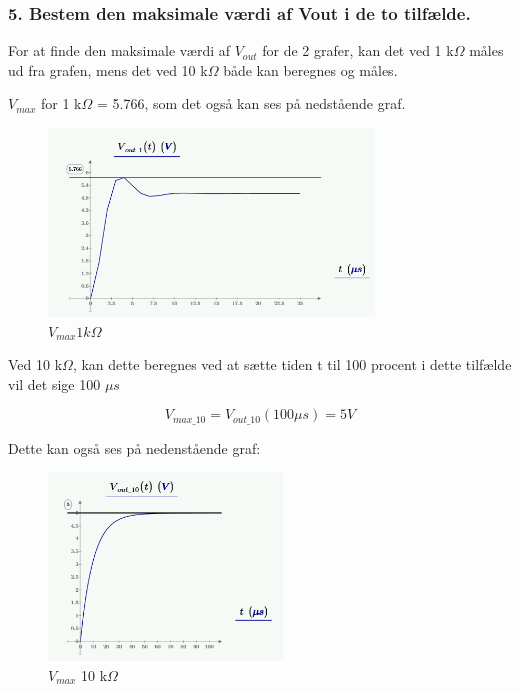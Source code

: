 \subsubsection*{5. Bestem den maksimale værdi af Vout i de to tilfælde.}

For at finde den maksimale værdi af $V_{out}$ for de 2 grafer, kan det ved 1 k$\Omega$ måles ud fra grafen, mens det ved 10 k$\Omega$ både kan beregnes og måles.

$V_{max}$ for 1 k$\Omega$ = 5.766, som det også kan ses på nedstående graf. 

\begin{figure}[h]
 \begin{center}
  \includegraphics[height=5cm]{P_Fig/figur16_ana2graf1Kmax}
  \caption{$V_{max} 1 k\Omega$}
  \label{max1K}
 \end{center}
\end{figure}

Ved 10 k$\Omega$, kan dette beregnes ved at sætte tiden t til 100 procent i dette tilfælde vil det sige 100 $\mu s$

\begin{equation}
V_{max\_10} = V_{out\_10}(100\mu s)  = 5 V
\end{equation} 

Dette kan også ses på nedenstående graf:

\begin{figure}[h]
 \begin{center}
  \includegraphics[height=5cm]{P_Fig/figur17_ana2graf10Kmax}
  \caption{$V_{max}$ 10 k$\Omega$}
  \label{max10K}
 \end{center}
\end{figure}